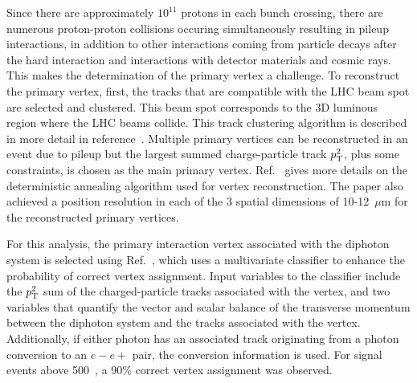 Since there are approximately $10^11$ protons in each bunch crossing, there are numerous proton-proton collisions occuring simultaneously resulting in pileup interactions, in addition to other interactions coming from particle decays after the hard interaction and interactions with detector materials and cosmic rays. This makes the determination of the primary vertex a challenge. To reconstruct the primary vertex, first, the tracks that are compatible with the LHC beam spot are selected and clustered. This beam spot corresponds to the 3D luminous region where the LHC beams collide. This track clustering algorithm is described in more detail in reference~\cite{Chatrchyan:2014fea}. Multiple primary vertices can be reconstructed in an event due to pileup but the largest summed charge-particle track $p_{\mathrm{T}}^2$, plus some constraints, is chosen as the main primary vertex. Ref.~\cite{CMS:2014pgm} gives more details on the deterministic annealing algorithm used for vertex reconstruction. The paper also achieved a position resolution in each of the 3 spatial dimensions of 10-12~$\mu$m for the reconstructed primary vertices.

For this analysis, the primary interaction vertex associated with the diphoton system is selected using Ref.~\cite{vertex1, vertex2}, which uses a multivariate classifier to enhance the probability of correct vertex assignment. Input variables to the classifier include the $p_{\mathrm{T}}^2$ sum of the charged-particle tracks associated with the vertex, and two variables that quantify the vector and scalar balance of the transverse momentum between the diphoton system and the tracks associated with the vertex. Additionally, if either photon has an associated track originating from a photon conversion to an $e-e+$ pair, the conversion information is used. For signal events above 500~\GeV, a 90\% correct vertex assignment was observed.



